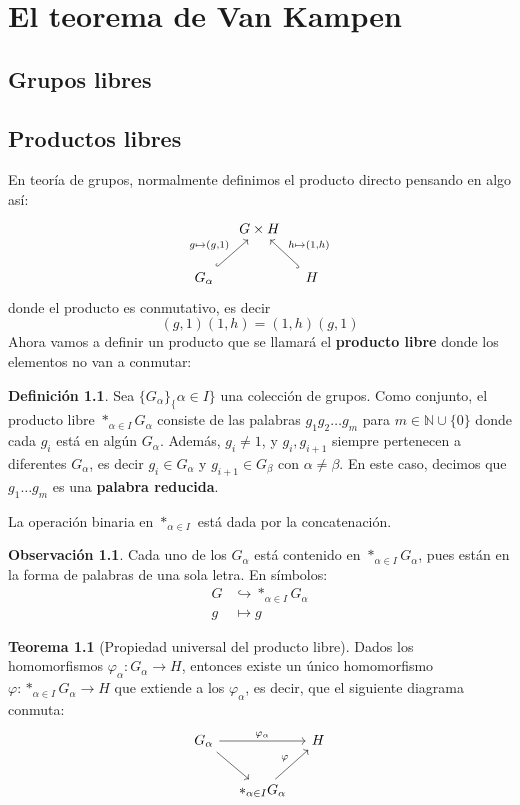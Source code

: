 \documentclass[spanish]{book}
\theoremstyle{definition}
\newtheorem*{defn}{Definición}
\newtheorem*{obs}{Observación}
\newtheorem*{teo}{Teorema}
\newcommand{\N}{\mathbb{N}}
\begin{document}
\chapter{El teorema de Van Kampen}
\section{Grupos libres}
\section{Productos libres}
	En teoría de grupos, normalmente definimos el producto directo pensando en algo así: 
	\[\begin{tikzcd}[column sep=1em, row sep=2em]
		&G\times H\\
		G_\alpha\arrow[ur,hook,"g\mapsto(g\text{,}1)"]&&H \arrow[ul,hook,swap,"h\mapsto(1\text{,}h)"]
	\end{tikzcd}\]
	donde el producto es conmutativo, es decir \[(g,1)(1,h)=(1,h)(g,1)\]
	Ahora vamos a definir un producto que se llamará el \textbf{producto libre} donde los elementos no van a conmutar:
	\begin{defn}
		Sea $\{G_\alpha\}_\{\alpha\in I\}$ una colección de grupos. Como conjunto, el producto libre $\ast_{\alpha\in I}G_\alpha$ consiste de las palabras $g_1g_2\ldots g_m$ para $m\in\N\cup\{0\}$ donde cada $g_i$ está en algún $G_\alpha$. Además, $g_i\neq1$, y $g_i,g_{i+1}$ siempre pertenecen a diferentes $G_\alpha$, es decir $g_i\in G_\alpha$ y $g_{i+1}\in G_\beta$ con $\alpha\neq\beta$. En este caso, decimos que $g_1\ldots g_m$ es una \textbf{palabra reducida}.
		
		La operación binaria en $\ast_{\alpha\in I}$ está dada por la concatenación.
	\end{defn}
	\begin{obs}
		Cada uno de los $G_\alpha$ está contenido en $\ast_{\alpha\in I}G_\alpha$, pues están en la forma de palabras de una sola letra. En símbolos:
		\begin{align*}
			G&\hookrightarrow\ast_{\alpha\in I}G_\alpha\\
			g&\mapsto g
		\end{align*}
	\end{obs}
	\begin{teo}[Propiedad universal del producto libre]
		Dados los homomorfismos $\varphi_\alpha:G_\alpha\to H$, entonces existe un único homomorfismo $\varphi:\ast_{\alpha\in I}G_\alpha\to H$ que extiende a los $\varphi_\alpha$, es decir, que el siguiente diagrama conmuta:
		\[\begin{tikzcd}[column sep=1em, row sep=2em]
			G_\alpha\arrow[rr,"\varphi_\alpha"]\arrow[dr]&&H\\
			&\ast_{\alpha\in I}G_\alpha \arrow[ur,"\varphi"]
		\end{tikzcd}\]
	\end{teo}
\end{document}
